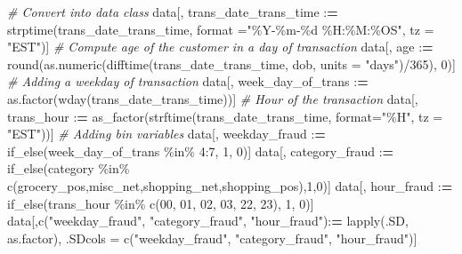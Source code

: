 \documentclass[
]{report}
\newenvironment{Shaded}{\begin{snugshade}}{\end{snugshade}}
\newcommand{\AttributeTok}[1]{\textcolor[rgb]{0.77,0.63,0.00}{#1}}
\newcommand{\CommentTok}[1]{\textcolor[rgb]{0.56,0.35,0.01}{\textit{#1}}}
\newcommand{\DecValTok}[1]{\textcolor[rgb]{0.00,0.00,0.81}{#1}}
\newcommand{\ErrorTok}[1]{\textcolor[rgb]{0.64,0.00,0.00}{\textbf{#1}}}
\newcommand{\FunctionTok}[1]{\textcolor[rgb]{0.00,0.00,0.00}{#1}}
\newcommand{\NormalTok}[1]{#1}
\newcommand{\OtherTok}[1]{\textcolor[rgb]{0.56,0.35,0.01}{#1}}
\newcommand{\SpecialCharTok}[1]{\textcolor[rgb]{0.00,0.00,0.00}{#1}}
\newcommand{\StringTok}[1]{\textcolor[rgb]{0.31,0.60,0.02}{#1}}
\begin{document}
\begin{Shaded}
\begin{Highlighting}[]
  \CommentTok{\# Convert into data class}
\NormalTok{  data[, trans\_date\_trans\_time }\SpecialCharTok{:}\ErrorTok{=} \FunctionTok{strptime}\NormalTok{(trans\_date\_trans\_time,}
                                           \AttributeTok{format =}\StringTok{"\%Y{-}\%m{-}\%d \%H:\%M:\%OS"}\NormalTok{, }
                                           \AttributeTok{tz =} \StringTok{"EST"}\NormalTok{)]}
  \CommentTok{\# Compute age of the customer in a day of transaction}
\NormalTok{  data[, age }\SpecialCharTok{:}\ErrorTok{=} \FunctionTok{round}\NormalTok{(}\FunctionTok{as.numeric}\NormalTok{(}\FunctionTok{difftime}\NormalTok{(trans\_date\_trans\_time, dob, }\AttributeTok{units =} \StringTok{"days"}\NormalTok{)}\SpecialCharTok{/}\DecValTok{365}\NormalTok{), }\DecValTok{0}\NormalTok{)]}
  \CommentTok{\# Adding a weekday of transaction}
\NormalTok{  data[, week\_day\_of\_trans }\SpecialCharTok{:}\ErrorTok{=} \FunctionTok{as.factor}\NormalTok{(}\FunctionTok{wday}\NormalTok{(trans\_date\_trans\_time))]}
  \CommentTok{\# Hour of the transaction}
\NormalTok{  data[, trans\_hour }\SpecialCharTok{:}\ErrorTok{=} \FunctionTok{as\_factor}\NormalTok{(}\FunctionTok{strftime}\NormalTok{(trans\_date\_trans\_time, }
                                          \AttributeTok{format=}\StringTok{"\%H"}\NormalTok{, }
                                          \AttributeTok{tz =} \StringTok{"EST"}\NormalTok{))]}
  \CommentTok{\# Adding bin variables}
\NormalTok{  data[, weekday\_fraud }\SpecialCharTok{:}\ErrorTok{=} \FunctionTok{if\_else}\NormalTok{(week\_day\_of\_trans }\SpecialCharTok{\%in\%} \DecValTok{4}\SpecialCharTok{:}\DecValTok{7}\NormalTok{, }\DecValTok{1}\NormalTok{, }\DecValTok{0}\NormalTok{)]}
\NormalTok{  data[, category\_fraud }\SpecialCharTok{:}\ErrorTok{=} 
         \FunctionTok{if\_else}\NormalTok{(category }\SpecialCharTok{\%in\%} \FunctionTok{c}\NormalTok{(}\StringTok{\textquotesingle{}grocery\_pos\textquotesingle{}}\NormalTok{,}\StringTok{\textquotesingle{}misc\_net\textquotesingle{}}\NormalTok{,}\StringTok{\textquotesingle{}shopping\_net\textquotesingle{}}\NormalTok{,}\StringTok{\textquotesingle{}shopping\_pos\textquotesingle{}}\NormalTok{),}\DecValTok{1}\NormalTok{,}\DecValTok{0}\NormalTok{)]}
\NormalTok{  data[, hour\_fraud }\SpecialCharTok{:}\ErrorTok{=} 
         \FunctionTok{if\_else}\NormalTok{(trans\_hour }\SpecialCharTok{\%in\%} \FunctionTok{c}\NormalTok{(}\StringTok{\textquotesingle{}00\textquotesingle{}}\NormalTok{, }\StringTok{\textquotesingle{}01\textquotesingle{}}\NormalTok{, }\StringTok{\textquotesingle{}02\textquotesingle{}}\NormalTok{, }\StringTok{\textquotesingle{}03\textquotesingle{}}\NormalTok{, }\StringTok{\textquotesingle{}22\textquotesingle{}}\NormalTok{, }\StringTok{\textquotesingle{}23\textquotesingle{}}\NormalTok{), }\DecValTok{1}\NormalTok{, }\DecValTok{0}\NormalTok{)]}
\NormalTok{  data[,}\FunctionTok{c}\NormalTok{(}\StringTok{"weekday\_fraud"}\NormalTok{, }\StringTok{"category\_fraud"}\NormalTok{, }\StringTok{"hour\_fraud"}\NormalTok{)}\SpecialCharTok{:}\ErrorTok{=} 
         \FunctionTok{lapply}\NormalTok{(.SD, as.factor), .SDcols }\OtherTok{=} \FunctionTok{c}\NormalTok{(}\StringTok{"weekday\_fraud"}\NormalTok{, }\StringTok{"category\_fraud"}\NormalTok{, }\StringTok{"hour\_fraud"}\NormalTok{)]}
  

\end{Highlighting}
\end{Shaded}
\end{document}
